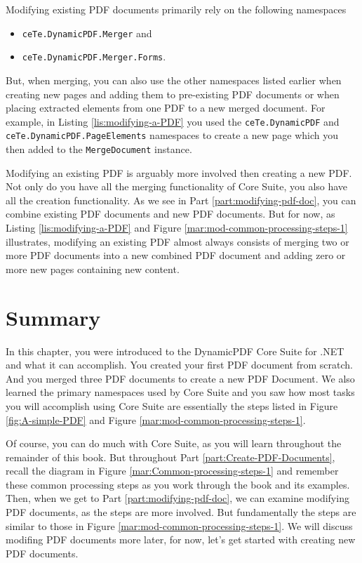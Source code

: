 \documentclass[american]{tufte-book}
\numberwithin{equation}{section}
\numberwithin{figure}{section}
\begin{document}
\leavevmode\egroup
Modifying existing PDF documents primarily rely on the following namespaces
\begin{itemize}
\item \texttt{ceTe.DynamicPDF.Merger} and 
\item \texttt{ceTe.DynamicPDF.Merger.Forms}.
\end{itemize}
But, when merging, you can also use the other namespaces listed earlier when creating new pages and adding them to pre-existing PDF documents or when placing extracted elements from one PDF to a new merged document. For example, in Listing \ref{lis:modifying-a-PDF} you used the  \texttt{ceTe.DynamicPDF} and  \texttt{ceTe.DynamicPDF.PageElements} namespaces to create a new page which you then added to the \texttt{MergeDocument} instance.

Modifying an existing PDF is arguably more involved then creating a new PDF. Not only do you have all the merging functionality of Core Suite, you also have all the creation functionality. As we see in Part \ref{part:modifying-pdf-doc}, you can combine existing PDF documents and new PDF documents. But for now, as Listing  \ref{lis:modifying-a-PDF} and Figure  \ref{mar:mod-common-processing-steps-1} illustrates, modifying an existing PDF almost always consists of merging two or more PDF documents into a new combined PDF document and adding zero or more new pages containing new content.

\section{Summary}

In this chapter, you were introduced to the DynamicPDF Core Suite for
.NET and what it can accomplish. You created your first PDF document
from scratch. And you merged three PDF documents to create a new PDF Document. We also learned the primary namespaces used by Core Suite and you saw how most tasks you will accomplish using Core Suite are essentially the steps listed in Figure \ref{fig:A-simple-PDF} and Figure \ref{mar:mod-common-processing-steps-1}. 

Of course, you can do much with Core Suite, as you will learn throughout
the remainder of this book. But throughout Part \ref{part:Create-PDF-Documents}, recall the diagram
in Figure \ref{mar:Common-processing-steps-1} and remember these
common processing steps as you work through the book and its examples. Then, when we get to Part \ref{part:modifying-pdf-doc}, we can examine modifying PDF documents, as the steps are more involved. But fundamentally the steps are similar to those in Figure \ref{mar:mod-common-processing-steps-1}. We will discuss modifing PDF documents more later, for now, let's get started with creating new PDF documents.
\end{document}
